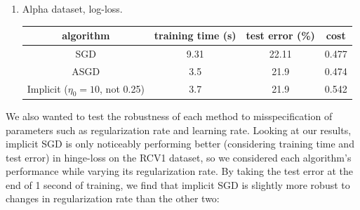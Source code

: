 \documentclass{article}
\begin{document}
\begin{enumerate}[(a)]
\begin{enumerate}[1.]
\item Alpha dataset, log-loss.
\begin{center}
\begin{tabular}{ c | c | c | c }
  algorithm & training time (s) & test error (\%) & cost \\ \hline                       
  SGD & 9.31 &  22.11 & 0.477\\
  ASGD & 3.5 & 21.9 & 0.474\\
  Implicit ($\eta_0=10$, not 0.25) & 3.7 & 21.9 & 0.542\\
\end{tabular}
\end{center}
\end{enumerate}
\end{enumerate}

We also wanted to test the robustness of each method to misspecification of parameters such as regularization rate and learning rate. Looking at our results, implicit SGD is only noticeably performing better (considering training time and test error) in hinge-loss on the RCV1 dataset, so we considered each algorithm's performance while varying its regularization rate. By taking the test error at the end of 1 second of training, we find that implicit SGD is slightly more robust to changes in regularization rate than the other two:
\end{document}

